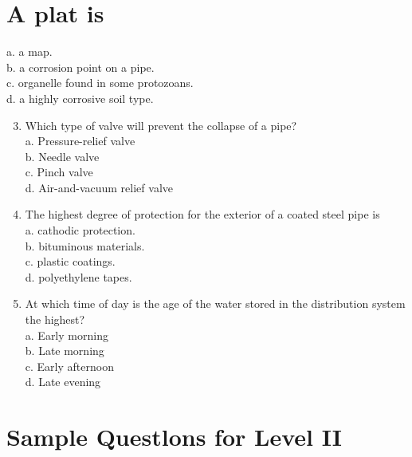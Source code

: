\documentclass[10pt]{article}
\begin{document}
\section{A plat is}
a. a map.\\
b. a corrosion point on a pipe.\\
c. organelle found in some protozoans.\\
d. a highly corrosive soil type.

\begin{enumerate}
  \setcounter{enumi}{2}
  \item Which type of valve will prevent the collapse of a pipe?\\
a. Pressure-relief valve\\
b. Needle valve\\
c. Pinch valve\\
d. Air-and-vacuum relief valve

  \item The highest degree of protection for the exterior of a coated steel pipe is\\
a. cathodic protection.\\
b. bituminous materials.\\
c. plastic coatings.\\
d. polyethylene tapes.

  \item At which time of day is the age of the water stored in the distribution system the highest?\\
a. Early morning\\
b. Late morning\\
c. Early afternoon\\
d. Late evening

\end{enumerate}

\section{Sample Questlons for Level II}
\end{document}
